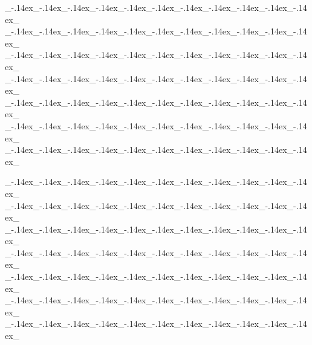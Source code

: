 \documentclass[HQ,english,Vampire]{VampireSheet}
\begin{document}
	\BigWoDSeperatorSheetNonText{}
	\begin{center}
		\vspace{-0.5\baselineskip}
		\begin{minipage}[t]{0.33333\textwidth}
			\raggedright
			\par
			\OtherTraits
			{\_\kern-.14ex\_\kern-.14ex\_\kern-.14ex\_\kern-.14ex\_\kern-.14ex\_\kern-.14ex\_\kern-.14ex\_\kern-.14ex\_\kern-.14ex\_\kern-.14ex\_\kern-.14ex\_}
			{\_\kern-.14ex\_\kern-.14ex\_\kern-.14ex\_\kern-.14ex\_\kern-.14ex\_\kern-.14ex\_\kern-.14ex\_\kern-.14ex\_\kern-.14ex\_\kern-.14ex\_\kern-.14ex\_}
			{\_\kern-.14ex\_\kern-.14ex\_\kern-.14ex\_\kern-.14ex\_\kern-.14ex\_\kern-.14ex\_\kern-.14ex\_\kern-.14ex\_\kern-.14ex\_\kern-.14ex\_\kern-.14ex\_}
			{\_\kern-.14ex\_\kern-.14ex\_\kern-.14ex\_\kern-.14ex\_\kern-.14ex\_\kern-.14ex\_\kern-.14ex\_\kern-.14ex\_\kern-.14ex\_\kern-.14ex\_\kern-.14ex\_}
			{\_\kern-.14ex\_\kern-.14ex\_\kern-.14ex\_\kern-.14ex\_\kern-.14ex\_\kern-.14ex\_\kern-.14ex\_\kern-.14ex\_\kern-.14ex\_\kern-.14ex\_\kern-.14ex\_}
			{\_\kern-.14ex\_\kern-.14ex\_\kern-.14ex\_\kern-.14ex\_\kern-.14ex\_\kern-.14ex\_\kern-.14ex\_\kern-.14ex\_\kern-.14ex\_\kern-.14ex\_\kern-.14ex\_}
			{\_\kern-.14ex\_\kern-.14ex\_\kern-.14ex\_\kern-.14ex\_\kern-.14ex\_\kern-.14ex\_\kern-.14ex\_\kern-.14ex\_\kern-.14ex\_\kern-.14ex\_\kern-.14ex\_}\par
			\vspace{-0.5\baselineskip}
			\OtherTraits
			{\_\kern-.14ex\_\kern-.14ex\_\kern-.14ex\_\kern-.14ex\_\kern-.14ex\_\kern-.14ex\_\kern-.14ex\_\kern-.14ex\_\kern-.14ex\_\kern-.14ex\_\kern-.14ex\_}
			{\_\kern-.14ex\_\kern-.14ex\_\kern-.14ex\_\kern-.14ex\_\kern-.14ex\_\kern-.14ex\_\kern-.14ex\_\kern-.14ex\_\kern-.14ex\_\kern-.14ex\_\kern-.14ex\_}
			{\_\kern-.14ex\_\kern-.14ex\_\kern-.14ex\_\kern-.14ex\_\kern-.14ex\_\kern-.14ex\_\kern-.14ex\_\kern-.14ex\_\kern-.14ex\_\kern-.14ex\_\kern-.14ex\_}
			{\_\kern-.14ex\_\kern-.14ex\_\kern-.14ex\_\kern-.14ex\_\kern-.14ex\_\kern-.14ex\_\kern-.14ex\_\kern-.14ex\_\kern-.14ex\_\kern-.14ex\_\kern-.14ex\_}
			{\_\kern-.14ex\_\kern-.14ex\_\kern-.14ex\_\kern-.14ex\_\kern-.14ex\_\kern-.14ex\_\kern-.14ex\_\kern-.14ex\_\kern-.14ex\_\kern-.14ex\_\kern-.14ex\_}
			{\_\kern-.14ex\_\kern-.14ex\_\kern-.14ex\_\kern-.14ex\_\kern-.14ex\_\kern-.14ex\_\kern-.14ex\_\kern-.14ex\_\kern-.14ex\_\kern-.14ex\_\kern-.14ex\_}
			{\_\kern-.14ex\_\kern-.14ex\_\kern-.14ex\_\kern-.14ex\_\kern-.14ex\_\kern-.14ex\_\kern-.14ex\_\kern-.14ex\_\kern-.14ex\_\kern-.14ex\_\kern-.14ex\_}
			

\end{minipage}
\end{center}
\end{document}
